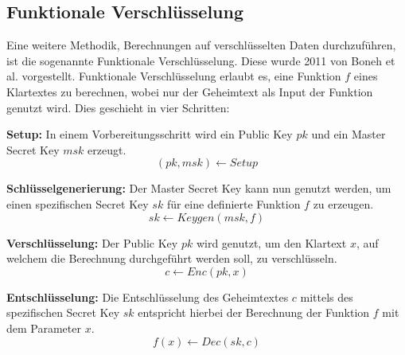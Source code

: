 \subsection{Funktionale Verschlüsselung}\label{sec:funktionale_verschlüsselung}

Eine weitere Methodik, Berechnungen auf verschlüsselten Daten durchzuführen, ist die sogenannte Funktionale Verschlüsselung.
Diese wurde 2011 von Boneh et al.\cite{P-44} vorgestellt.
Funktionale Verschlüsselung erlaubt es, eine Funktion $f$ eines Klartextes zu berechnen, wobei nur der Geheimtext als Input der Funktion genutzt wird.
Dies geschieht in vier Schritten\cite{P-44}:
\begin{compactenum}
    \item \textbf{Setup: } In einem Vorbereitungsschritt wird ein Public Key $pk$ und ein Master Secret Key $msk$ erzeugt.
    \begin{equation*}
        (pk, msk) \xleftarrow{} Setup
    \end{equation*}
    \item \textbf{Schlüsselgenerierung: } Der Master Secret Key kann nun genutzt werden, um einen spezifischen Secret Key $sk$ für eine definierte Funktion $f$ zu erzeugen.
    \begin{equation*}
        sk \xleftarrow{} Keygen(msk, f)
    \end{equation*}
    \item \textbf{Verschlüsselung: } Der Public Key $pk$ wird genutzt, um den Klartext $x$, auf welchem die Berechnung durchgeführt werden soll, zu verschlüsseln.
    \begin{equation*}
        c \xleftarrow{} Enc(pk,x)
    \end{equation*}
    \item \textbf{Entschlüsselung: } Die Entschlüsselung des Geheimtextes $c$ mittels des spezifischen Secret Key $sk$ entspricht hierbei der Berechnung der Funktion $f$ mit dem Parameter $x$.
    \begin{equation*}
        f(x) \xleftarrow{} Dec(sk,c)
    \end{equation*}
\end{compactenum}

